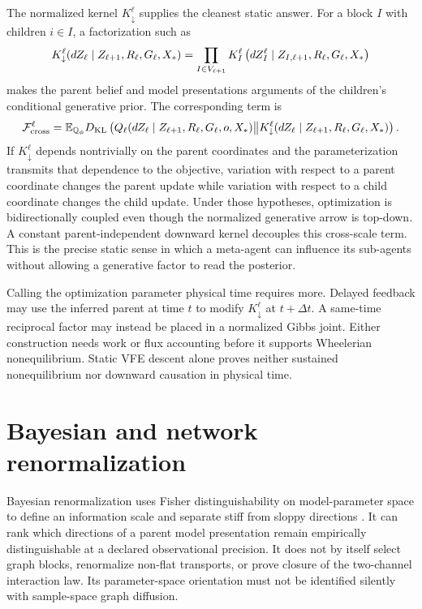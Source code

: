 The normalized kernel $K_\downarrow^\ell$ supplies the cleanest static answer.
For a block $I$ with children $i\in I$, a factorization such as
\begin{equation}
K_\downarrow^\ell(dZ_\ell\mid Z_{\ell+1},R_\ell,G_\ell,X_*)
=\prod_{I\in V_{\ell+1}}K_I^\ell
\left(dZ_I^\ell\mid Z_{I,\ell+1},R_\ell,G_\ell,X_*\right)
\label{eq:full-graph-downward-kernel}
\end{equation}
makes the parent belief and model presentations arguments of the children's
conditional generative prior. The corresponding term is
\begin{equation}
\mathcal F_{\mathrm{cross}}^\ell
=\mathbb E_{\mathbb Q_\phi}
D_{\mathrm{KL}}\left(
Q_\ell(dZ_\ell\mid Z_{\ell+1},R_\ell,G_\ell,o,X_*)
\middle\Vert
K_\downarrow^\ell(dZ_\ell\mid Z_{\ell+1},R_\ell,G_\ell,X_*)
\right).
\label{eq:full-graph-cross-scale-kl}
\end{equation}
If $K_\downarrow^\ell$ depends nontrivially on the parent coordinates and the
parameterization transmits that dependence to the objective, variation with
respect to a parent coordinate changes the parent update while variation with
respect to a child coordinate changes the child update. Under those
hypotheses, optimization is bidirectionally coupled even though the normalized
generative arrow is top-down. A constant parent-independent downward kernel
decouples this cross-scale term. This is the precise static sense in which a
meta-agent can influence its sub-agents without allowing a generative factor
to read the posterior. 

Calling the optimization parameter physical time requires more. Delayed
feedback may use the inferred parent at time $t$ to modify
$K_\downarrow^\ell$ at $t+\Delta t$. A same-time reciprocal factor may instead
be placed in a normalized Gibbs joint. Either construction needs work or flux
accounting before it supports Wheelerian nonequilibrium. Static VFE descent
alone proves neither sustained nonequilibrium nor downward causation in
physical time. 

\section{Bayesian and network renormalization}
\label{sec:full-graph-vfe-literature}

Bayesian renormalization uses Fisher distinguishability on model-parameter
space to define an information scale and separate stiff from sloppy
directions \citep{BermanKlingerStapleton2023}. It can rank which directions
of a parent model presentation remain empirically distinguishable at a
declared observational precision. It does not by itself select graph blocks,
renormalize non-flat transports, or prove closure of the two-channel
interaction law. Its parameter-space orientation must not be identified
silently with sample-space graph diffusion.

